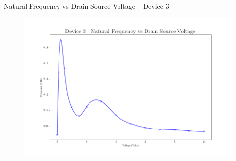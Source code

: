 \documentclass{beamer}
\begin{document}
\begin{frame}{Natural Frequency vs Drain-Source Voltage -- Device 3}
    \begin{figure}
        \centering
        \includegraphics[scale=0.35]{Figures/Device_3/NaturalFrequency.png}
        \label{fig:nfreq_3}
    \end{figure}
\end{frame}
 
\end{document}
